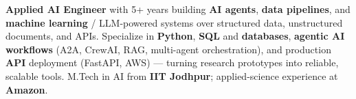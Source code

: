 \documentclass[letter,10pt]{article}
\begin{document}

\textbf{Applied AI Engineer} with 5+ years building \textbf{AI agents}, \textbf{data pipelines}, and \textbf{machine learning} / LLM-powered systems over structured data, unstructured documents, and APIs.
Specialize in \textbf{Python}, \textbf{SQL} and \textbf{databases}, \textbf{agentic AI workflows} (A2A, CrewAI, RAG, multi-agent orchestration), and production \textbf{API} deployment (FastAPI, AWS) — turning research prototypes into reliable, scalable tools.
M.Tech in AI from \textbf{IIT Jodhpur}; applied-science experience at \textbf{Amazon}.
\end{document}
